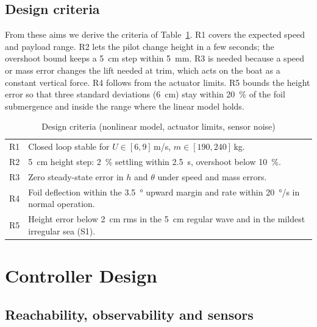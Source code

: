 \documentclass[conference]{IEEEtran}
\begin{document}
\subsection{Design criteria}

From these aims we derive the criteria of Table~\ref{tab:req}. R1 covers the
expected speed and payload range. R2 lets the pilot change height in a few
seconds; the overshoot bound keeps a \SI{5}{cm} step within \SI{5}{mm}. R3 is
needed because a speed or mass error changes the lift needed at trim, which acts
on the boat as a constant vertical force. R4 follows from the actuator limits.
R5 bounds the height error so that three standard deviations (\SI{6}{cm}) stay
within \SI{20}{\percent} of the foil submergence and inside the range where the
linear model holds.

\begin{table}[t]
\centering
\caption{Design criteria (nonlinear model, actuator limits, sensor noise)}
\label{tab:req}
\small
\begin{tabular}{@{}lp{6.9cm}@{}}
\toprule
R1 & Closed loop stable for $U\in[6,9]$\,\si{m/s}, $m\in[190,240]$\,\si{kg}. \\
R2 & \SI{5}{cm} height step: \SI{2}{\percent} settling within \SI{2.5}{s}, overshoot below \SI{10}{\percent}. \\
R3 & Zero steady-state error in $h$ and $\theta$ under speed and mass errors. \\
R4 & Foil deflection within the \SI{+3.5}{\degree} upward margin and rate within \SI{20}{\degree/s} in normal operation. \\
R5 & Height error below \SI{2}{cm} rms in the \SI{5}{cm} regular wave and in the mildest irregular sea (S1). \\
\bottomrule
\end{tabular}
\end{table}

\section{Controller Design}
\label{sec:design}

\subsection{Reachability, observability and sensors}
\end{document}
